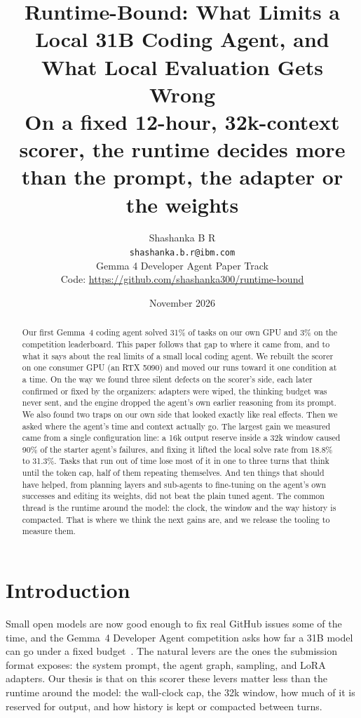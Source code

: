 \documentclass[11pt]{article}
\title{\textbf{Runtime-Bound: What Limits a Local 31B Coding Agent, and What Local Evaluation Gets Wrong}\\[8pt]
\large On a fixed 12-hour, 32k-context scorer, the runtime decides more than the prompt, the adapter or the weights}
\author{Shashanka B R\\\small\texttt{shashanka.b.r@ibm.com}\\[4pt]\small Gemma 4 Developer Agent Paper Track\\\small Code: \url{https://github.com/shashanka300/runtime-bound}}
\date{November 2026}
\begin{document}
\maketitle

\begin{abstract}
Our first Gemma~4 coding agent solved 31\% of tasks on our own GPU and 3\% on the competition leaderboard. This paper follows that gap to where it came from, and to what it says about the real limits of a small local coding agent. We rebuilt the scorer on one consumer GPU (an RTX 5090) and moved our runs toward it one condition at a time. On the way we found three silent defects on the scorer's side, each later confirmed or fixed by the organizers: adapters were wiped, the thinking budget was never sent, and the engine dropped the agent's own earlier reasoning from its prompt. We also found two traps on our own side that looked exactly like real effects. Then we asked where the agent's time and context actually go. The largest gain we measured came from a single configuration line: a 16k output reserve inside a 32k window caused 90\% of the starter agent's failures, and fixing it lifted the local solve rate from 18.8\% to 31.3\%. Tasks that run out of time lose most of it in one to three turns that think until the token cap, half of them repeating themselves. And ten things that should have helped, from planning layers and sub-agents to fine-tuning on the agent's own successes and editing its weights, did not beat the plain tuned agent. The common thread is the runtime around the model: the clock, the window and the way history is compacted. That is where we think the next gains are, and we release the tooling to measure them.
\end{abstract}

\section{Introduction}
Small open models are now good enough to fix real GitHub issues some of the time, and the Gemma~4 Developer Agent competition asks how far a 31B model can go under a fixed budget~\citep{gemma4paper2026}. The natural levers are the ones the submission format exposes: the system prompt, the agent graph, sampling, and LoRA adapters. Our thesis is that on this scorer these levers matter less than the runtime around the model: the wall-clock cap, the 32k window, how much of it is reserved for output, and how history is kept or compacted between turns.
\end{document}
